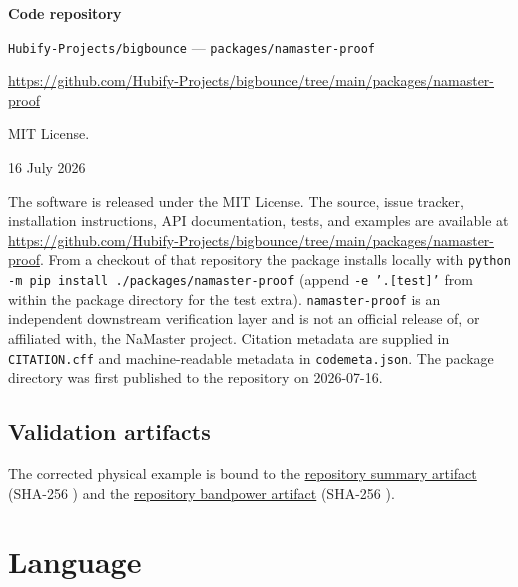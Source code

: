 {\bf Code repository}

\begingroup\sloppy
\begin{description}[noitemsep,topsep=0pt]
	\item[Name:] \nolinkurl{Hubify-Projects/bigbounce} ---
	  \nolinkurl{packages/namaster-proof}
	\item[Identifier:]
	  \url{https://github.com/Hubify-Projects/bigbounce/tree/main/packages/namaster-proof}
	\item[Licence:] MIT License.
	\item[Date published:] 16 July 2026
\end{description}
\par\endgroup

\begingroup\sloppy
The software is released under the MIT License.
The source, issue tracker, installation instructions, API documentation, tests,
and examples are available at
\url{https://github.com/Hubify-Projects/bigbounce/tree/main/packages/namaster-proof}.
From a checkout of that repository the package installs locally with
\texttt{python -m pip install ./packages/namaster-proof} (append
\texttt{-e '.[test]'} from within the package directory for the test extra).
\texttt{namaster-proof} is an independent downstream verification layer and is
not an official release of, or affiliated with, the NaMaster project.
Citation metadata are supplied in \texttt{CITATION.cff} and machine-readable
metadata in \texttt{codemeta.json}. The package directory was first published
to the repository on 2026-07-16.
\par\endgroup

\subsection*{Validation artifacts}

The corrected physical example is bound to the
\href{https://github.com/Hubify-Projects/bigbounce/blob/main/reproducibility/p1_namaster_500mc/results/physical_spectrum_v2/summary.json}
{repository summary artifact} (SHA-256
\texttt{})
and the
\href{https://github.com/Hubify-Projects/bigbounce/blob/main/reproducibility/p1_namaster_500mc/results/physical_spectrum_v2/bandpowers.npz}
{repository bandpower artifact} (SHA-256
\texttt{}).

\section*{Language}

